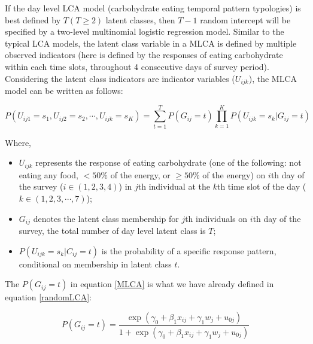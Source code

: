 If the day level LCA model (carbohydrate eating temporal pattern typologies) is best defined by $T (T \geqslant 2)$ latent classes, then $T-1$ random intercept will be specified by a two-level multinomial logistic regression model. Similar to the typical LCA models, the latent class variable in a MLCA is defined by multiple observed indicators (here is defined by the responses of eating carbohydrate within each time slots, throughout 4 consecutive days of survey period). Considering the latent class indicators are indicator variables ($U_{ijk}$), the MLCA model can be written as follows:\vspace{-1cm}

\begin{equation}
P(U_{ij1} = s_1, U_{ij2} = s_2, \cdots, U_{ijk} = s_{K}) = \sum_{t=1}^{T}P(G_{ij}=t)\prod_{k=1}^{K}P(U_{ijk} = s_k | G_{ij} = t)
\label{MLCA}
\end{equation}
\vspace{-0.8cm}


Where, 

\begin{itemize}
	\item $ U_{ijk} $ represents the response of eating carbohydrate (one of the following: not eating any food, $< 50\%$ of the energy, or $\geqslant 50\%$ of the energy) on $i$th day of the survey ($i \in (1,2,3,4)$) in $j$th individual at the $k$th time slot of the day ($k \in (1, 2, 3, \cdots, 7)$);
	\item $G_{ij}$ denotes the latent class membership for $j$th individuals on $i$th day of the survey, the total number of day level latent class is $T$;
	\item $P(U_{ijk} = s_k|C_{ij} = t)$ is the probability of a specific response pattern, conditional on membership in latent class $t$.
\end{itemize}


The $P(G_{ij} = t)$ in equation \ref{MLCA} is what we have already defined in equation \ref{randomLCA}: \vspace{-0.3cm} 

\begin{equation}
P(G_{ij} = t) = \frac{\exp{(\gamma_0 + \beta_{1}x_{ij} + \gamma_1 w_j + u_{0j})}}{1 + \exp{(\gamma_0 + \beta_{1}x_{ij} + \gamma_1 w_j + u_{0j})}} 
\end{equation}

